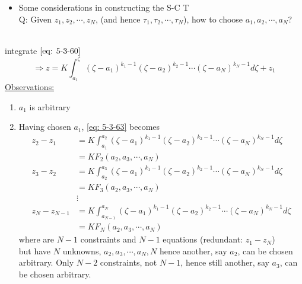 \begin{itemize}
\begin{enumerate}[label = \protect\circled{\arabic*}]
\begin{example}{For a Pentagon, the S-C T is }
\begin{equation}
\therefore z = K\left(-\frac{1}{\zeta}\right)\left[1 + \mathcal{O}(\frac{1}{\zeta})\right] + C
\label{eq: 5-3-62}
\end{equation}
hence as $\zeta\to\infty$, $z\to C$
\end{example}
\item The action of $K$ in $\displaystyle\frac{dz}{d\zeta}$ is to magnify $K=\sigma e^{i\psi}$ and rotate the polygon on $z$- plane
\end{enumerate}
\item Some considerations in constructing the S-C T\\
Q: Given $z_1,z_2,\cdots, z_N$, (and hence $\tau_1,\tau_2,\cdots,\tau_N$), how to choose $a_1,a_2,\cdots,a_N$?
\end{itemize}
\begin{note}\mbox{}\\
integrate $\eqref{eq: 5-3-60}$
\begin{equation}
\Longrightarrow z = K\int_{a_1}^{\zeta}\left(\zeta-a_1\right)^{k_1-1}\left(\zeta-a_2\right)^{k_2-1}\cdots\left(\zeta-a_N\right)^{k_N-1}d\zeta + z_1
\label{eq: 5-3-63}
\end{equation}
\underline{Observations:}
\begin{enumerate}[label = \protect\circled{\arabic*}]
\item $a_1$ is arbitrary
\item Having chosen $a_1$, \eqref{eq: 5-3-63} becomes
\begin{align*}
z_2 - z_1
&= K\int_{a_1}^{a_2}\left(\zeta-a_1\right)^{k_1-1}\left(\zeta-a_2\right)^{k_2-1}\cdots\left(\zeta-a_N\right)^{k_N-1}d\zeta \\
&= KF_2\left(a_2,a_3,\cdots,a_N\right)\\
z_3 - z_2
&= K\int_{a_2}^{a_3}\left(\zeta-a_1\right)^{k_1-1}\left(\zeta-a_2\right)^{k_2-1}\cdots\left(\zeta-a_N\right)^{k_N-1}d\zeta \\
&= KF_3\left(a_2,a_3,\cdots,a_N\right) \\
&\vdots \\
z_N - z_{N-1}
&= K\int_{a_{N-1}}^{a_N}\left(\zeta-a_1\right)^{k_1-1}\left(\zeta-a_2\right)^{k_2-1}\cdots\left(\zeta-a_N\right)^{k_N-1}d\zeta \\
&= KF_N\left(a_2,a_3,\cdots,a_N\right)
\end{align*}
where are $N-1$ constraints and $N-1$ equations (redundant: $z_1-z_N$)\\
but have $N$ unknowns, $a_2,a_3,\cdots,a_N,N$ hence another, say $a_2$, can be chosen arbitrary. Only $N-2$ constraints, not $N-1$, hence still another, say $a_3$, can be chosen arbitrary. 

\end{enumerate}
\end{note}

